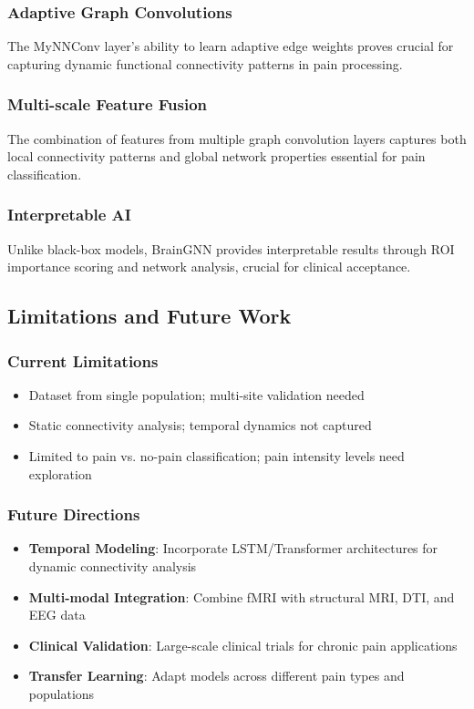 \documentclass[10pt,journal,compsoc]{IEEEtran}
\begin{document}
\subsubsection{Adaptive Graph Convolutions}
The MyNNConv layer's ability to learn adaptive edge weights proves crucial for capturing dynamic functional connectivity patterns in pain processing.

\subsubsection{Multi-scale Feature Fusion}
The combination of features from multiple graph convolution layers captures both local connectivity patterns and global network properties essential for pain classification.

\subsubsection{Interpretable AI}
Unlike black-box models, BrainGNN provides interpretable results through ROI importance scoring and network analysis, crucial for clinical acceptance.

\subsection{Limitations and Future Work}

\subsubsection{Current Limitations}
\begin{itemize}
\item Dataset from single population; multi-site validation needed
\item Static connectivity analysis; temporal dynamics not captured
\item Limited to pain vs. no-pain classification; pain intensity levels need exploration
\end{itemize}

\subsubsection{Future Directions}
\begin{itemize}
\item \textbf{Temporal Modeling}: Incorporate LSTM/Transformer architectures for dynamic connectivity analysis
\item \textbf{Multi-modal Integration}: Combine fMRI with structural MRI, DTI, and EEG data
\item \textbf{Clinical Validation}: Large-scale clinical trials for chronic pain applications
\item \textbf{Transfer Learning}: Adapt models across different pain types and populations
\end{itemize}
\end{document}
